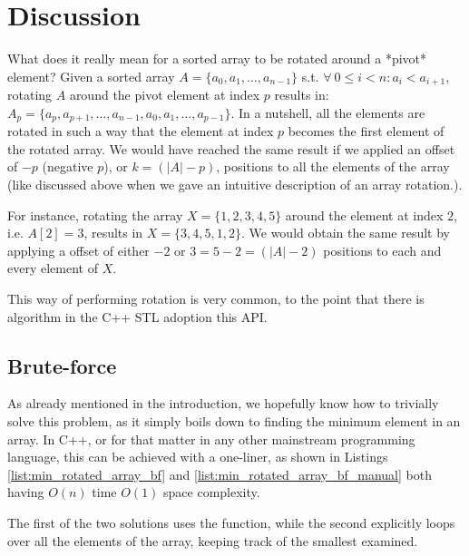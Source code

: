 \section{Discussion}
\label{min_rotated_array:sec:discussion}
What does it really mean for a sorted array to be rotated around a *pivot* element? Given a sorted array $A=\{a_0, a_1, \ldots,a_{n-1}\}$ s.t. $\forall \: 0 \leq i < n: a_i < a_{i+1}$, rotating $A$ around the pivot element at index $p$ results in: $A_p=\{a_p, a_{p+1}, \ldots,a_{n-1}, a_0, a_1, \ldots, a_{p-1}\}$. 
In a nutshell, all the elements are rotated in such a way that the element at index $p$ becomes the first element of the rotated array. We would have reached the same result if we applied an offset of $-p$ (negative $p$), or $k=(|A|-p)$, positions to all the elements of the array (like discussed above when we gave an intuitive description of an array rotation.). 

For instance, rotating the array $X=\{1,2,3,4,5\}$ around the element at index $2$, i.e. $A[2]=3$, results in $X=\{3,4,5,1,2\}$. We would obtain the same result by applying a offset of either $-2$ or $3=5-2=(|A|-2)$ positions to each and every element of $X$. 

This way of performing rotation is very common, to the point that there is algorithm in the C++ STL\cite{cit::std::rotate} adoption this API.


\subsection{Brute-force}
\label{min_rotated_array:sec:bruteforce}
As already mentioned in the introduction, we hopefully know how to trivially solve this problem, as it simply boils down to finding the minimum element in an array.
In C++, or for that matter in any other mainstream programming language, this can be achieved with a one-liner, as shown in Listings \ref{list:min_rotated_array_bf} and \ref{list:min_rotated_array_bf_manual} both having $O(n)$ time $O(1)$ space complexity.






The first of the two solutions uses the  function, while the second explicitly loops over all the elements of the array, keeping track of the smallest examined. 

